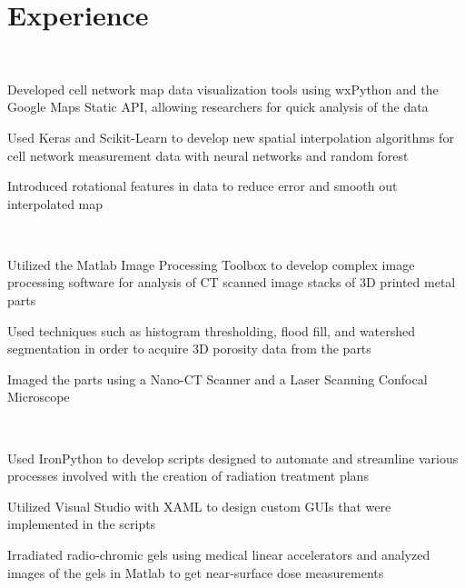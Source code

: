 \documentclass[]{deedy-resume-openfont}
\begin{document}
\hfill
\begin{minipage}[t]{0.66\textwidth} 


\section{Experience}

\\
\vspace{\topsep} %
\begin{tightemize}
\item Developed cell network map data visualization tools using wxPython and the Google Maps Static API, allowing researchers for quick analysis of the data
\item Used Keras and Scikit-Learn to develop new spatial interpolation algorithms for cell network measurement data with neural networks and random forest 
\item Introduced rotational features in data to reduce error and smooth out interpolated map

\end{tightemize}
\sectionsep

\\
\begin{tightemize}
\item Utilized the Matlab Image Processing Toolbox to develop complex image processing software for analysis of CT scanned image stacks of 3D printed metal parts
\item Used techniques such as histogram thresholding, flood fill, and watershed segmentation in order to acquire 3D porosity data from the parts
\item Imaged the parts using a Nano-CT Scanner and a Laser Scanning Confocal Microscope
\end{tightemize}
\sectionsep

\\
\begin{tightemize}
\item Used IronPython to develop scripts designed to automate and streamline various processes involved with the creation of radiation treatment plans 
\item Utilized Visual Studio with XAML to design custom GUIs that were implemented in the scripts
\item Irradiated radio-chromic gels using medical linear accelerators and analyzed images of the gels in Matlab to get near-surface dose measurements   
\end{tightemize}
\sectionsep


\end{minipage}
\end{document}
